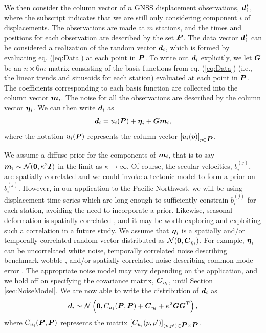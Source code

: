 \documentclass[extra,mreferee]{gji}
\begin{document}

We then consider the column vector of $n$ GNSS displacement
observations, $\data^*_i$, where the subscript indicates that we are
still only considering component $i$ of displacements. The
observations are made at $m$ stations, and the times and positions for
each observation are described by the set $\points$. The data vector
$\data^*_i$ can be considered a realization of the random vector
$\data_i$, which is formed by evaluating eq. (\ref{eq:Data}) at each
point in $\points$. To write out $\data_i$ explicitly, we let $\G$ be
an $n \times 6m$ matrix consisting of the basis functions from eq.
(\ref{eq:Data}) (i.e., the linear trends and sinusoids for each
station) evaluated at each point in $\points$. The coefficients
corresponding to each basis function are collected into the column
vector $\mitbf{m}_i$. The noise for all the observations are described
by the column vector $\mitbf{\eta}_i$. We can then write $\data_i$ as
\begin{equation}\label{eq:DataVec}
\data_i = u_i(\points) + \mitbf{\eta}_i + \G\mitbf{m}_i,
\end{equation}
where the notation $u_i(\points)$ represents the column vector
$[u_i(p)]_{p \in \points}$.


We assume a diffuse prior for the components of $\mitbf{m}_i$, that is
to say $\mitbf{m}_i \sim \mathcal{N}(\zeros,\kappa^2\eye)$ in the
limit as $\kappa \to \infty$. Of course, the secular velocities,
$b_i^{(j)}$, are spatially correlated and we could invoke a tectonic
model to form a prior on $b_i^{(j)}$. However, in our application to
the Pacific Northwest, we will be using displacement time series which
are long enough to sufficiently constrain $b_i^{(j)}$ for each
station, avoiding the need to incorporate a prior. Likewise, seasonal
deformation is spatially correlated \citep{Dong2002,Langbein2008}, and
it may be worth exploring and exploiting such a correlation in a
future study. We assume that $\mitbf{\eta}_i$ is a spatially and/or
temporally correlated random vector distributed as
$\mathcal{N}(\zeros,\mitbf{C}_{\eta_i})$. For example,
$\mitbf{\eta}_i$ can be uncorrelated white noise, temporally
correlated noise describing benchmark wobble
\citep[e.g.,][]{Wyatt1982,Wyatt1989}, and/or spatially correlated
noise describing common mode error \citep[e.g.,][]{Wdowinski1997}. The
appropriate noise model may vary depending on the application, and we
hold off on specifying the covariance matrix, $\mitbf{C}_{\eta_i}$,
until Section \ref{sec:NoiseModel}. We are now able to write the
distribution of $\data_i$ as
\begin{equation}\label{eq:DataDist}
\data_i \sim \mathcal{N}\left(\zeros, C_{u_i}(\points,\points) + 
                                      \mitbf{C}_{\eta_i}  + 
                                      \kappa^2\G\G^T \right),
\end{equation}
where $C_{u_i}(\points,\points)$ represents the matrix
$[C_{u_i}(p,p')]_{(p,p') \in \points \times \points}$.
\end{document}

